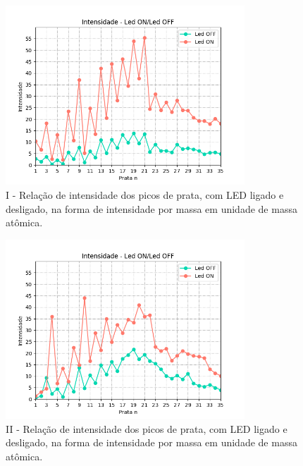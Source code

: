  
 \begin{figure}
  \centering  
  \includegraphics[width=0.8\textwidth]{exp_01/Led_ON_Led_OFF_intensidade_prata_N_.png}
  \caption{I - Relação de intensidade dos picos de prata, com LED ligado e desligado, na forma de intensidade por massa em unidade de massa atômica.}
  \label{fig:exp_01_picos_LEDONOFF_N}
\end{figure}
 
 \begin{figure}
  \centering  
  \includegraphics[width=0.8\textwidth]{exp_02/LED_ON_Led_OFF_intensidade_prata_N_.png}
  \caption{II - Relação de intensidade dos picos de prata, com LED ligado e desligado, na forma de intensidade por massa em unidade de massa atômica.}
  \label{fig:exp_02_picos_LEDONOFF_N}
\end{figure}
 
